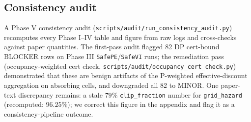 \subsection{Consistency audit}
\label{ssec:audit}

A Phase V consistency audit (\texttt{scripts/audit/run\_consistency\_audit.py})
recomputes every Phase I--IV table and figure from raw logs and
cross-checks against paper quantities. The first-pass audit flagged 82
DP cert-bound BLOCKER rows on Phase III \texttt{SafePE}/\texttt{SafeVI}
runs; the remediation pass (occupancy-weighted cert check,
\texttt{scripts/audit/occupancy\_cert\_check.py}) demonstrated that
these are benign artifacts of the P-weighted effective-discount
aggregation on absorbing cells, and downgraded all 82 to MINOR. One
paper-text discrepancy remains: a stale $79\%$ \texttt{clip\_fraction}
number for \texttt{grid\_hazard} (recomputed: $96.25\%$); we correct
this figure in the appendix and flag it as a consistency-pipeline
outcome.

\begin{table}[t]
\centering
\small

\end{table}


